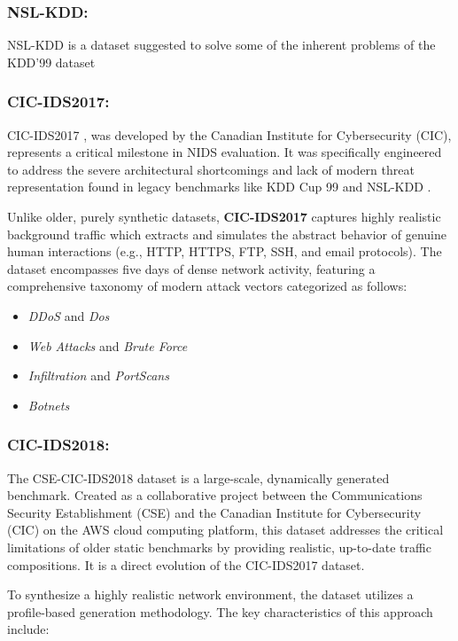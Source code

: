 \documentclass[12pt, a4paper]{report}
\begin{document}
\subsubsection{NSL-KDD:}
NSL-KDD \cite{kdd2009datset} is a dataset suggested to solve some of the inherent problems of the KDD'99 dataset

\subsubsection{CIC-IDS2017:}
CIC-IDS2017 \cite{CICIDS2017}, was developed by the Canadian Institute for Cybersecurity (CIC), represents a critical milestone in NIDS evaluation. It was specifically engineered to address the severe architectural shortcomings and lack of modern threat representation found in legacy benchmarks like KDD Cup 99 and NSL-KDD \cite{sharafaldin2018toward}. 

Unlike older, purely synthetic datasets, \textbf{CIC-IDS2017} captures highly realistic background traffic which extracts and simulates the abstract behavior of genuine human interactions (e.g., HTTP, HTTPS, FTP, SSH, and email protocols). The dataset encompasses five days of dense network activity, featuring a comprehensive taxonomy of modern attack vectors categorized as follows:
\begin{itemize}
    \item \textit{DDoS} and \textit{Dos} 
    \item \textit{Web Attacks} and \textit{Brute Force}
    \item \textit{Infiltration} and \textit{PortScans} 
    \item \textit{Botnets}
\end{itemize}


\subsubsection{CIC-IDS2018:}

The CSE-CIC-IDS2018 \cite{cic2018dataset} dataset is a large-scale, dynamically generated benchmark. Created as a collaborative project between the Communications Security Establishment (CSE) and the Canadian Institute for Cybersecurity (CIC) on the AWS cloud computing platform, this dataset addresses the critical limitations of older static benchmarks by providing realistic, up-to-date traffic compositions. It is  a direct evolution of the CIC-IDS2017 dataset.
 
To synthesize a highly realistic network environment, the dataset utilizes a profile-based generation methodology. The key characteristics of this approach include:
\end{document}
